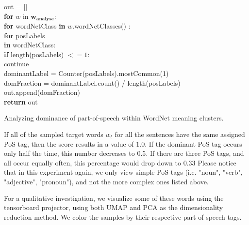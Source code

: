 \documentclass[a4paper,12pt,twoside,openright]{report}
\begin{document}
\begin{algorithm}[H]
\SetAlgoLined
{}

out = [] \\

\textbf{for}  $w$ in $\mathbf{w_{\text{analyse}}}$:  \\
\quad \quad \textbf{for} wordNetClass \textbf{in} $w$.wordNetClasses() :  \\
\quad \quad \quad \textbf{for} posLabels \\
\quad \quad \quad \textbf{in} wordNetClass:  \\

\quad \quad \quad \quad \textbf{if} length(posLabels) $<= 1$: \\
\quad \quad \quad \quad \quad \quad  continue \\

\quad \quad \quad \quad dominantLabel = Counter(posLabels).mostCommon(1) \\

\quad \quad \quad \quad domFraction = dominantLabel.count() / length(posLabels) \\

\quad \quad \quad \quad out.append(domFraction) \\


\textbf{return} out
 
 \caption{Analyzing dominance of part-of-speech within WordNet meaning clusters.}
\end{algorithm}

If all of the sampled target words $w_t$ for all the sentences have the same assigned PoS tag, then the score results in a value of $1.0$.
If the dominant PoS tag occurs only half the time, this number decreases to $0.5$.
If there are three PoS tags, and all occur equally often, this percentage would drop down to $0.33$
Please notice that in this experiment again, we only view simple PoS tags (i.e. "noun", "verb", "adjective", "pronoun"), and not the more complex ones listed above.

For a qualitative investigation, we visualize some of these words using the tensorboard projector, using both UMAP and PCA as the dimensionality reduction method.
We color the samples by their respective part of speech tags.
\end{document}
